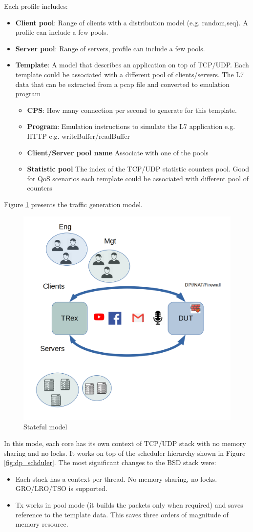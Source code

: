 \documentclass[letterpaper]{article}
\begin{document}
Each profile includes:
\begin{itemize}
\item \textbf{Client pool}: Range of clients with a distribution model (e.g. random,seq). A profile can include a few pools.
\item \textbf{Server pool}: Range of servers, profile can include a few pools. 
\item \textbf{Template}: A model that describes an application on top of TCP/UDP. Each template could be associated with a different pool of clients/servers. The L7 data that can be extracted from a pcap file and converted to emulation program
\begin{itemize}
\item \textbf{CPS}: How many connection per second to generate for this template. 
\item \textbf{Program}: Emulation instructions to simulate the L7 application e.g. HTTP e.g. writeBuffer/readBuffer
\item \textbf{Client/Server pool name} Associate with one of the pools 
\item \textbf{Statistic pool} The index of the TCP/UDP statistic counters pool. Good for QoS scenarios each template could be associated with different pool of counters 
\end{itemize}
\end{itemize}

Figure \ref{fig:astf} presents the traffic generation model. 

\begin{figure}[h]
\includegraphics[width=0.3
\textwidth, center]{stateful_model.png}
\caption{Stateful model}
\label{fig:astf}
\end{figure}

In this mode, each core has its own context of TCP/UDP stack with no memory sharing and no locks. It works on top of the scheduler hierarchy shown in Figure \ref{fig:dp_schduler}.
The most significant changes to the BSD stack were:
\begin{itemize}
\item Each stack has a context per thread. No memory sharing, no locks. GRO/LRO/TSO is supported. 
\item Tx works in pool mode (it builds the packets only when required) and saves reference to the template data. This saves three orders of magnitude of memory resource.
\end{itemize}
\end{document}
